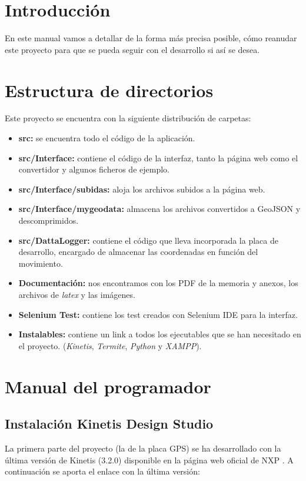 
\section{Introducción}
En este manual vamos a detallar de la forma más precisa posible, cómo reanudar este proyecto para que se pueda seguir con el desarrollo si así se desea.

\section{Estructura de directorios}
Este proyecto se encuentra con la siguiente distribución de carpetas:
\begin{itemize}
	\item
	\textbf{src:} se encuentra todo el código de la aplicación.
	\item
	\textbf{src/Interface:} contiene el código de la interfaz, tanto la página web como el convertidor y algunos ficheros de ejemplo.
	\item
	\textbf{src/Interface/subidas:} aloja los archivos subidos a la página web.
	\item
	\textbf{src/Interface/mygeodata:} almacena los archivos convertidos a GeoJSON y descomprimidos.
	\item
	\textbf{src/DattaLogger:} contiene el código que lleva incorporada la placa de desarrollo, encargado de almacenar las coordenadas en función del movimiento. 
	\item
	\textbf{Documentación:} nos encontramos con los PDF de la memoria y anexos, los archivos de \textit{latex} y las imágenes.
	\item
	\textbf{Selenium Test:} contiene los test creados con Selenium IDE para la interfaz.
	\item
	\textbf{Instalables:} contiene un link a todos los ejecutables que se han necesitado en el proyecto. (\textit{Kinetis}, \textit{Termite}, \textit{Python} y \textit{XAMPP}).
\end{itemize}

\section{Manual del programador}
\subsection{Instalación Kinetis Design Studio}
La primera parte del proyecto (la de la placa GPS) se ha desarrollado con la última versión de Kinetis (3.2.0) disponible en la página web oficial de NXP .
A continuación se aporta el enlace con la última versión:

